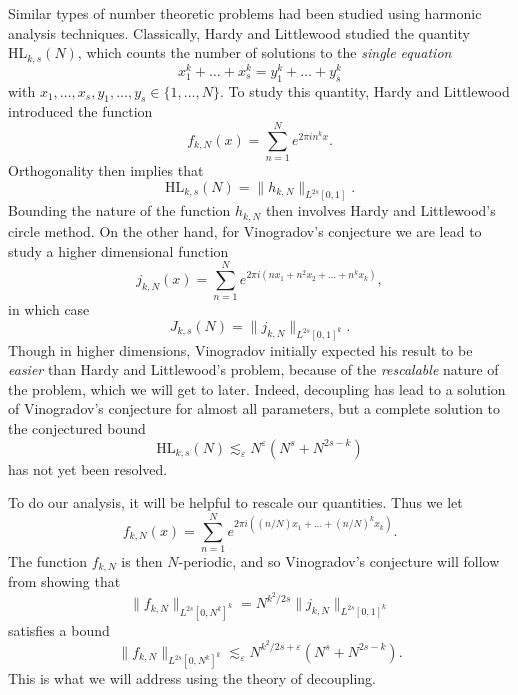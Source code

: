Similar types of number theoretic problems had been studied using harmonic analysis techniques. Classically, Hardy and Littlewood studied the quantity $\text{HL}_{k,s}(N)$, which counts the number of solutions to the \emph{single equation}
%
\[ x_1^k + \dots + x_s^k = y_1^k + \dots + y_s^k \]
%
with $x_1,\dots,x_s,y_1,\dots,y_s \in \{ 1, \dots, N \}$. To study this quantity, Hardy and Littlewood introduced the function
%
\[ f_{k,N}(x) = \sum_{n = 1}^N e^{2 \pi i n^k x}. \]
%
Orthogonality then implies that
%
\[ \text{HL}_{k,s}(N) = \| h_{k,N} \|_{L^{2s}[0,1]}. \]
%
Bounding the nature of the function $h_{k,N}$ then involves Hardy and Littlewood's circle method. On the other hand, for Vinogradov's conjecture we are lead to study a higher dimensional function
%
\[ j_{k,N}(x) = \sum_{n = 1}^N e^{2 \pi i (n x_1 + n^2 x_2 + \dots + n^k x_k)}, \]
%
in which case
%
\[ J_{k,s}(N) = \| j_{k,N} \|_{L^{2s}[0,1]^k}. \]
%
Though in higher dimensions, Vinogradov initially expected his result to be \emph{easier} than Hardy and Littlewood's problem, because of the \emph{rescalable} nature of the problem, which we will get to later. Indeed, decoupling has lead to a solution of Vinogradov's conjecture for almost all parameters, but a complete solution to the conjectured bound
%
\[ \text{HL}_{k,s}(N) \lesssim_\varepsilon N^\varepsilon ( N^s + N^{2s - k} ) \]
%
has not yet been resolved.

To do our analysis, it will be helpful to rescale our quantities. Thus we let
%
\[ f_{k,N}(x) = \sum_{n = 1}^N e^{2 \pi i ( (n/N) x_1 + \dots + (n/N)^k x_k )}. \]
%
The function $f_{k,N}$ is then $N$-periodic, and so Vinogradov's conjecture will follow from showing that
%
\[ \| f_{k,N} \|_{L^{2s}[0,N^k]^k} = N^{k^2/2s} \| j_{k,N} \|_{L^{2s}[0,1]^k} \]
%
satisfies a bound
%
\[ \| f_{k,N} \|_{L^{2s}[0,N^k]^k} \lesssim_\varepsilon N^{k^2/2s + \varepsilon} (N^s + N^{2s - k}). \]
%
This is what we will address using the theory of decoupling.

